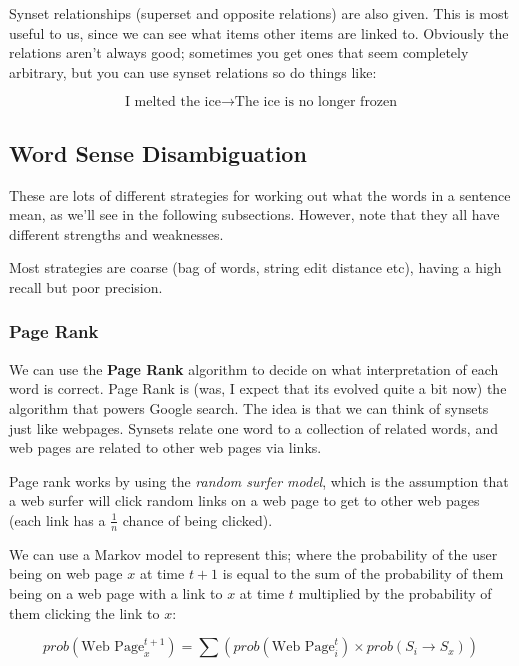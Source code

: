 Synset relationships (superset and opposite relations) are also given. This is
most useful to us, since we can see what items other items are linked to.
Obviously the relations aren't always good; sometimes you get ones that seem
completely arbitrary, but you can use synset relations so do things like:

\[
  \text{I melted the ice} \rightarrow \text{The ice is no longer frozen}
\] 

\subsection{Word Sense Disambiguation}

These are lots of different strategies for working out what the words in a
sentence mean, as we'll see in the following subsections. However, note that
they all have different strengths and weaknesses.

Most strategies are coarse (bag of words, string edit distance etc), having a
high recall but poor precision.

\subsubsection{Page Rank}


We can use the \textbf{Page Rank} algorithm to decide on what interpretation of
each word is correct. Page Rank is (was, I expect that its evolved quite a bit
now) the algorithm that powers Google search. The idea is that we can think of
synsets just like webpages. Synsets relate one word to a collection of related
words, and web pages are related to other web pages via links.

Page rank works by using the \textit{random surfer model}, which is the
assumption that a web surfer will click random links on a web page to get to
other web pages (each link has a $\frac{1}{n}$ chance of being clicked).

We can use a Markov model to represent this; where the probability of the user
being on web page $x$ at time $t + 1$ is equal to the sum of the probability of
them being on a web page with a link to $x$ at time $t$ multiplied by the
probability of them clicking the link to $x$:

\[
  prob(\text{Web Page}_x^{t + 1}) =
    \sum (prob(\text{Web Page}_i^t) \times prob(S_i \rightarrow S_x))
\]

